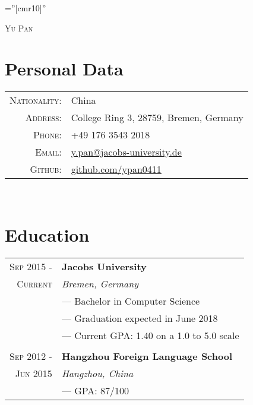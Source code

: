 \documentclass[a4paper,10pt]{article}
\begin{document}
	
	
	\pagestyle{empty} %
	
	\font\fb=''[cmr10]'' %
	
	\par{\centering
		{\huge{\textsc{Yu Pan}}}\bigskip\par}
	
	\section{Personal Data}
	\begin{tabular}{rl}
		\textsc{Nationality:}&China \\
		\textsc{Address:}   & College Ring 3, 28759, Bremen, Germany\\
		\textsc{Phone:}     & +49 176 3543 2018\\
		\textsc{Email:}     & \href{mailto:y.pan@jacobs-university.de}{y.pan@jacobs-university.de} \\
		\textsc{Github:} &
		\href{https://github.com/ypan0411}{github.com/ypan0411}
	\end{tabular}
	
	~\\
	
	\section{Education}
	\begin{tabular}{r|l}	
		\textsc{Sep 2015 - } & \textbf{Jacobs University} \\\textsc{Current}&\emph{Bremen, Germany}
		\\& --- Bachelor in Computer Science
		\\& --- Graduation expected in June 2018
		\\& --- Current GPA: 1.40 on a 1.0 to 5.0 scale
		\\ \multicolumn{2}{c}{} \\
		\textsc{Sep 2012 - } & \textbf{Hangzhou Foreign Language School} \\\textsc{Jun 2015}&\emph{Hangzhou, China}
		\\& --- GPA: 87/100
	\end{tabular}
	
\end{document}
